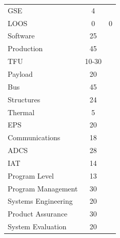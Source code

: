 \begin{table}[htbp]
\begin{tabular}{p{10cm} | c | c }
        \hspace{2.0cm}GSE &         4 &          \\

      \hspace{2.0cm}LOOS &         0 &         0 \\ \hline

  \hspace{1.0cm}Software &         25 &          \\

\hspace{1.0cm}Production &         45 &          \\ \hline

       \hspace{2.0cm}TFU &         10-30 &          \\ \hline

   \hspace{2.5cm}Payload &         20 &          \\

       \hspace{2.5cm}Bus &         45 &          \\ \hline

 \hspace{3.0cm}Structures &         24 &          \\

   \hspace{3.0cm}Thermal &         5 &          \\

       \hspace{3.0cm}EPS &         20 &          \\

\hspace{3.0cm}Communications &         18 &          \\

      \hspace{3.0cm}ADCS &         28 &          \\ \hline

       \hspace{2.5cm}IAT &         14&          \\

\hspace{2.5cm}Program Level &         13 &          \\ \hline
 \hspace{3.0cm}Program Management &         30 &          \\
 \hspace{3.0cm}Systems Engineering &         20 &          \\
 \hspace{3.0cm}Product Assurance &         30 &          \\
 \hspace{3.0cm}System Evaluation &         20 &          \\ \hline


\end{tabular}
\end{table}
